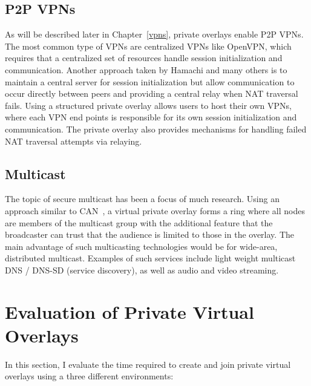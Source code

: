 \subsection{P2P VPNs}
As will be described later in Chapter~\ref{vpns}, private overlays enable P2P
VPNs.  The most common type of VPNs are centralized VPNs like OpenVPN, which
requires that a centralized set of resources handle session initialization and
communication.  Another approach taken by Hamachi and many others is to
maintain a central server for session initialization but allow communication to
occur directly between peers and providing a central relay when NAT traversal
fails.  Using a structured private overlay allows users to host their own
VPNs, where each VPN end points is responsible for its own session
initialization and communication.  The private overlay also provides mechanisms
for handling failed NAT traversal attempts via relaying.

\subsection{Multicast}
The topic of secure multicast has been a focus of much research.  Using an
approach similar to CAN~\cite{can_multicast}, a virtual private overlay forms
a ring where all nodes are members of the multicast group with the additional
feature that the broadcaster can trust that the audience is limited to those
in the overlay.  The main advantage of such multicasting technologies would be
for wide-area, distributed multicast.  Examples of such services include light
weight multicast DNS / DNS-SD (service discovery), as well as audio and video
streaming.

\section{Evaluation of Private Virtual Overlays}
In this section, I evaluate the time required to create and join private virtual
overlays using a three different environments:

